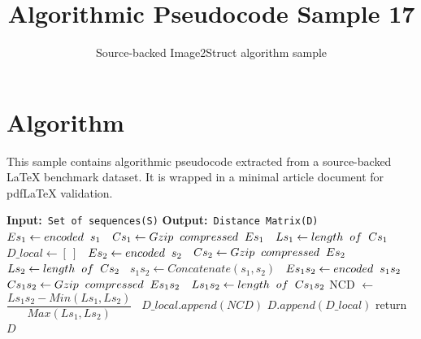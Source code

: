 \documentclass[11pt]{article}
\title{Algorithmic Pseudocode Sample 17}
\author{Source-backed Image2Struct algorithm sample}
\date{}
\begin{document}
\maketitle
\section{Algorithm}
This sample contains algorithmic pseudocode extracted from a source-backed LaTeX benchmark dataset. It is wrapped in a minimal article document for pdfLaTeX validation.

\begin{algorithm}[htbp]
\caption{Source-backed algorithmic procedure}
\begin{algorithmic}[1]
\Statex \textbf{Input:}\texttt{ Set of sequences(S)}
\Statex \textbf{Output:}\texttt{ Distance Matrix(D)}
\State \texttt{ $Es_{1} \gets encoded \hspace{0.2cm} s_{1}$}
\State \texttt{ $Cs_{1} \gets Gzip\hspace{0.2cm} compressed \hspace{0.2cm} Es_{1}$}
\State \texttt{ $Ls_{1} \gets length \hspace{0.2cm} of \hspace{0.2cm} Cs_{1}$}
\State \texttt{ $D \_ local \gets [\ ]$}
\State \texttt{ $Es_{2} \gets encoded \hspace{0.2cm} s_{2}$}
\State \texttt{ $Cs_{2} \gets Gzip \hspace{0.2cm} compressed \hspace{0.2cm} Es_{2}$}
\State \texttt{ $Ls_{2} \gets length \hspace{0.2cm} of \hspace{0.2cm} Cs_{2}$}
\State \texttt{ $s_{1}s_{2} \gets Concatenate(s_{1},s_{2})$}
\State \texttt{ $Es_{1}s_{2} \gets encoded \hspace{0.2cm} s_{1}s_{2}$}
\State \texttt{ $Cs_{1}s_{2} \gets Gzip \hspace{0.2cm} compressed \hspace{0.2cm} Es_{1}s_{2}$}
\State \texttt{ $Ls_{1}s_{2} \gets length \hspace{0.2cm} of \hspace{0.2cm} Cs_{1}s_{2}$}
\State NCD $\gets$ $\dfrac{L s_1 s_2 - Min (Ls_1, Ls_2)}{Max(Ls_1, Ls_2)}$
\State \texttt{ $D\_local.append(NCD)$}
\EndFor
\State $D.append(D\_local)$
\EndFor
\State return $D$
\end{algorithmic}
\end{algorithm}
\end{document}
